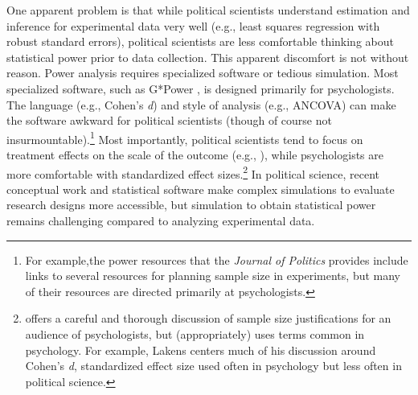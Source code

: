 \documentclass[12pt]{article}
\begin{document}
One apparent problem is that while political scientists understand estimation and inference for experimental data very well (e.g., least squares regression with robust standard errors), political scientists are less comfortable thinking about statistical power prior to data collection. 
This apparent discomfort is not without reason. 
Power analysis requires specialized software or tedious simulation. 
Most specialized software, such as G*Power \citep{Faul2007, Faul2009}, is designed primarily for psychologists. 
The language (e.g., Cohen's \emph{d}) and style of analysis (e.g., ANCOVA) can make the software awkward for political scientists (though of course not insurmountable).\footnote{
  For example,the power resources that the \emph{Journal of Politics} provides include links to several resources for planning sample size in experiments, but many of their resources are directed primarily at psychologists.
  }
Most importantly, political scientists tend to focus on treatment effects on the scale of the outcome (e.g., \citealt{King2000}), while psychologists are more comfortable with standardized effect sizes.\footnote{
  \cite{Lakens2022} offers a careful and thorough discussion of sample size justifications for an audience of psychologists, but (appropriately) uses terms common in psychology.
  For example, Lakens centers much of his discussion around Cohen's \emph{d}, standardized effect size used often in psychology but less often in political science.
  } 
In political science, recent conceptual work and statistical software \citep{Blair2019, Blair2023} make complex simulations to evaluate research designs more accessible, but simulation to obtain statistical power remains challenging compared to analyzing experimental data.
\end{document}

